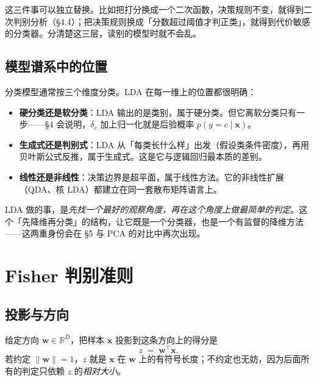 \documentclass[11pt,a4paper,fontset=windows,zihao=-4]{ctexart}
\newcommand{\R}{\mathbb{R}}
\newcommand{\bw}{\mathbf{w}}
\newcommand{\bx}{\mathbf{x}}
\newcommand{\tp}{^{\top}}
\newcommand{\norm}[1]{\lVert #1\rVert}
\begin{document}
这三件事可以独立替换。比如把打分换成一个二次函数，决策规则不变，就得到二次判别分析（\S4.4）；把决策规则换成「分数超过阈值才判正类」，就得到代价敏感的分类器。分清楚这三层，读别的模型时就不会乱。

\subsection{模型谱系中的位置}

分类模型通常按三个维度分类。LDA 在每一维上的位置都很明确：

\begin{itemize}
  \item \textbf{硬分类还是软分类}：LDA 输出的是类别，属于硬分类。但它离软分类只有一步——\S4 会说明，$\delta_c$ 加上归一化就是后验概率 $p(y=c\mid\bx)$。
  \item \textbf{生成式还是判别式}：LDA 从「每类长什么样」出发（假设类条件密度），再用贝叶斯公式反推，属于生成式。这是它与逻辑回归最本质的差别。
  \item \textbf{线性还是非线性}：决策边界是超平面，属于线性方法。它的非线性扩展（QDA、核 LDA）都建立在同一套散布矩阵语言上。
\end{itemize}

\begin{keybox}[一句话]
LDA 做的事，是\emph{先找一个最好的观察角度，再在这个角度上做最简单的判定}。这个「先降维再分类」的结构，让它既是一个分类器，也是一个有监督的降维方法——这两重身份会在 \S5 与 PCA 的对比中再次出现。
\end{keybox}


\section{Fisher 判别准则}

\subsection{投影与方向}

给定方向 $\bw\in\R^{D}$，把样本 $\bx$ 投影到这条方向上的得分是
\begin{equation}
  z \;=\; \bw\tp\bx .
  \label{eq:proj}
\end{equation}
若约定 $\norm{\bw}=1$，$z$ 就是 $\bx$ 在 $\bw$ 上的有符号长度；不约定也无妨，因为后面所有的判定只依赖 $z$ 的\emph{相对大小}。
\end{document}
